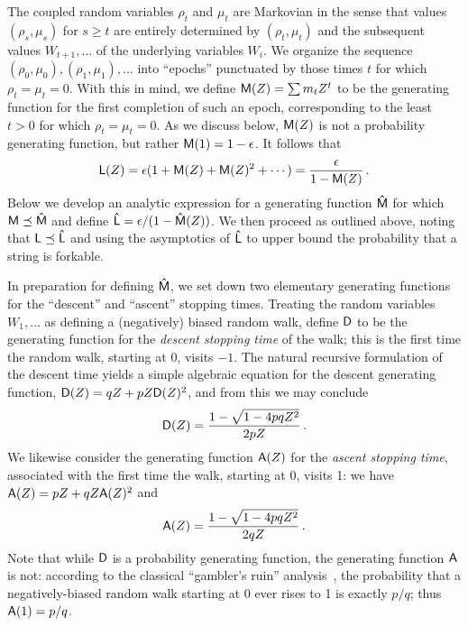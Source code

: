   The coupled random variables $\rho_t$ and $\mu_t$ are Markovian
  in the sense that values $(\rho_s, \mu_s)$ for $s \geq t$ are
  entirely determined by $(\rho_t, \mu_t)$ and the subsequent
  values $W_{t+1}, \ldots$ of the underlying variables $W_i$. We
  organize the sequence
  $(\rho_0, \mu_0), (\rho_1, \mu_1), \ldots$ into ``epochs''
  punctuated by those times $t$ for which $\rho_t = \mu_t =
  0$. With this in mind, we define $\mathsf{M}(Z) = \sum m_t Z^t$ to be
  the generating function for the first completion of such an epoch,
  corresponding to the least $t > 0$ for which
  $\rho_t = \mu_t = 0$. As we discuss below, $\mathsf{M}(Z)$ is not a
  probability generating function, but rather
  $\mathsf{M}(1) = 1 - \epsilon$. It follows that
  \begin{equation}\label{eq:L-def}
    \mathsf{L}(Z) = \epsilon(1 + \mathsf{M}(Z) + \mathsf{M}(Z)^2 + \cdots) =
    \frac{\epsilon}{1 - \mathsf{M}(Z)}\,.
  \end{equation}
  Below we develop an analytic expression for a generating function
  $\mathsf{\hat{M}}$ for which $\mathsf{M} \preceq \mathsf{\hat{M}}$ and define
  $\mathsf{\hat{L}} = \epsilon/(1 - \mathsf{\hat{M}}(Z))$. We then proceed as
  outlined above, noting that $\mathsf{L} \preceq \mathsf{\hat{L}}$ and using
  the asymptotics of $\mathsf{\hat{L}}$ to upper bound the probability
  that a string is forkable.

  In preparation for defining $\mathsf{\hat{M}}$, we set down two
  elementary generating functions for the ``descent'' and ``ascent''
  stopping times. Treating the random variables $W_1, \ldots$ as
  defining a (negatively) biased random walk, define $\mathsf{D}$ to be
  the generating function for the \emph{descent stopping time} of the
  walk; this is the first time the random walk, starting at 0, visits
  $-1$. The natural recursive formulation of the descent time yields a
  simple algebraic equation for the descent generating function,
  $\mathsf{D}(Z) = qZ + pZ \mathsf{D}(Z)^2$, and from this we may conclude
  \[
    \mathsf{D}(Z) = \frac{1 - \sqrt{1 - 4pqZ^2}}{2pZ}\,.
  \]
  We likewise consider the generating function $\mathsf{A}(Z)$ for the
  \emph{ascent stopping time}, associated with the first time the
  walk, starting at 0, visits 1: we have
  $\mathsf{A}(Z) = pZ + qZ \mathsf{A}(Z)^2$ and
  \[
    \mathsf{A}(Z) = \frac{1 - \sqrt{1 - 4pqZ^2}}{2qZ}\,.
  \]
  Note that while $\mathsf{D}$ is a probability generating function, the
  generating function $\mathsf{A}$ is not: according to the classical
  ``gambler's ruin'' analysis~\cite{Grinstead:1997ng}, the probability
  that a negatively-biased random walk starting at 0 ever rises to 1
  is exactly $p/q$; thus $\mathsf{A}(1) = p/q$.

